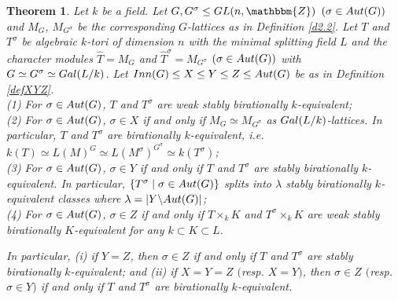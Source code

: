 \documentclass[10pt,a4paper]{amsart}
\newtheorem{theorem}{Theorem}
\newcommand{\GL}{{\rm GL}}\newcommand{\SL}{{\rm SL}}
\newcommand{\bZ}{\mathbbm{Z}}\newcommand{\bQ}{\mathbbm{Q}}
\begin{document}
\begin{theorem}\label{thmXYZ}
Let $k$ be a field. 
Let $G, G^\sigma\leq {\rm GL}(n,\bZ)$ $(\sigma\in {\rm Aut}(G))$ 
and $M_G$, $M_{G^\sigma}$ be the corresponding $G$-lattices 
as in Definition \ref{d2.2}. 
Let $T$ and $T^\sigma$ be algebraic $k$-tori of dimension $n$ 
with the minimal splitting field $L$ and the character modules 
$\widehat{T}=M_G$ and $\widehat{T}^\sigma=M_{G^\sigma}$ 
$(\sigma\in {\rm Aut}(G))$
with 
$G\simeq G^\sigma\simeq {\rm Gal}(L/k)$. 
Let ${\rm Inn}(G)\leq X\leq Y\leq Z\leq {\rm Aut}(G)$ 
be as in Definition \ref{defXYZ}.\\
{\rm (1)} For $\sigma\in {\rm Aut}(G)$, 
$T$ and $T^\sigma$ are weak stably birationally $k$-equivalent;\\
{\rm (2)} For $\sigma\in {\rm Aut}(G)$, 
$\sigma\in X$ if and only if 
$M_G\simeq M_{G^\sigma}$ as ${\rm Gal}(L/k)$-lattices. 
In particular,  
$T$ and $T^\sigma$ are birationally $k$-equivalent, i.e. 
$k(T)\simeq L(M)^G\simeq L(M^\sigma)^{G^\sigma}\simeq k(T^\sigma)$;\\
{\rm (3)} For $\sigma\in {\rm Aut}(G)$, 
$\sigma\in Y$ if and only if 
$T$ and $T^\sigma$ are stably birationally $k$-equivalent. 
In particular, 
$\{T^\sigma\mid \sigma\in {\rm Aut}(G)\}$ splits into 
$\lambda$ stably birationally $k$-equivalent classes 
where 
$\lambda=|Y\backslash {\rm Aut}(G)|$;\\ %
{\rm (4)} For $\sigma\in {\rm Aut}(G)$, 
$\sigma\in Z$ if and only if 
$T\times_k K$ and $T^\sigma\times_k K$ 
are weak stably birationally $K$-equivalent for any $k\subset K\subset L$. 

In particular, {\rm (i)} if $Y=Z$, then 
$\sigma \in Z$ 
if and only if 
$T$ and $T^\sigma$ are stably birationally $k$-equivalent; 
and {\rm (ii)} if $X=Y=Z$ $($resp. $X=Y$$)$, then 
$\sigma\in Z$ $($resp. $\sigma\in Y$$)$
if and only if 
$T$ and $T^\sigma$ are birationally $k$-equivalent. 
\end{theorem}
\end{document}
